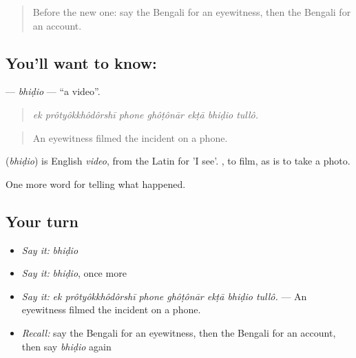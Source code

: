 \label{lesson:BN-C301-bhidio}



\begin{quote}
Before the new one: say the Bengali for an eyewitness, then the Bengali for an account.
\end{quote}

\subsection*{You'll want to know: }
\textbf{} — \emph{bhiḍio} — \textquotedblleft{}a video\textquotedblright{}.

\begin{quote}
      
\end{quote}

\begin{quote}
\emph{ek prôtyôkkhôdôrshī phone ghôṭônār ekṭā bhiḍio tullô.}
\end{quote}

\begin{quote}
An eyewitness filmed the incident on a phone.
\end{quote}

\begin{cousinweb}
\textbf{} (\emph{bhiḍio}) is English \emph{video}, from the Latin for 'I see'.  , to film, as \textbf{ } is to take a photo.
\end{cousinweb}

\begin{grammarlens}[title={What you've built}]
One more word for telling what happened.
\end{grammarlens}

\subsection*{Your turn}
\begin{itemize}
\raggedright
  \item \emph{Say it:} \emph{bhiḍio}
  \item \emph{Say it:} \emph{bhiḍio}, once more
  \item \emph{Say it:} \emph{ek prôtyôkkhôdôrshī phone ghôṭônār ekṭā bhiḍio tullô.} — An eyewitness filmed the incident on a phone.
  \item \emph{Recall:} say the Bengali for an eyewitness, then the Bengali for an account, then say \emph{bhiḍio} again
\end{itemize}

